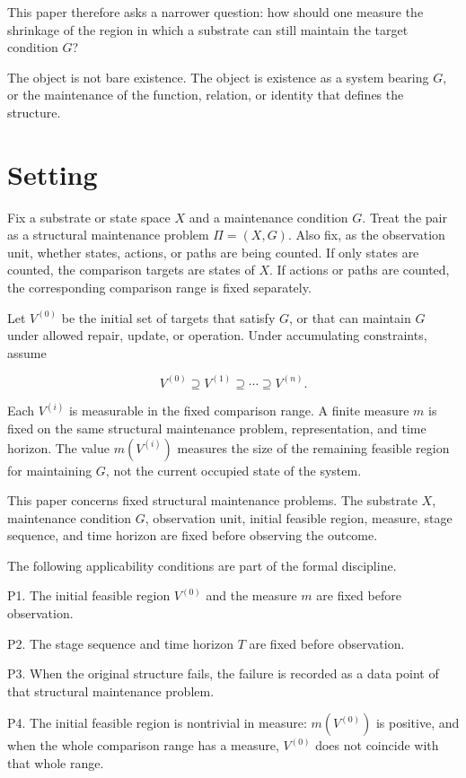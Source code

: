 \documentclass[12pt,a4paper]{article}
\begin{document}
This paper therefore asks a narrower question: how should one measure the shrinkage of the region in which a substrate can still maintain the target condition \(G\)?

The object is not bare existence. The object is existence as a system bearing \(G\), or the maintenance of the function, relation, or identity that defines the structure.

\section{Setting}\label{setting}

Fix a substrate or state space \(X\) and a maintenance condition \(G\). Treat the pair as a structural maintenance problem \(\Pi=(X,G)\). Also fix, as the observation unit, whether states, actions, or paths are being counted. If only states are counted, the comparison targets are states of \(X\). If actions or paths are counted, the corresponding comparison range is fixed separately.

Let \(V^{(0)}\) be the initial set of targets that satisfy \(G\), or that can maintain \(G\) under allowed repair, update, or operation. Under accumulating constraints, assume

\[
V^{(0)} \supseteq V^{(1)} \supseteq \cdots \supseteq V^{(n)}.
\]

Each \(V^{(i)}\) is measurable in the fixed comparison range. A finite measure \(m\) is fixed on the same structural maintenance problem, representation, and time horizon. The value \(m(V^{(i)})\) measures the size of the remaining feasible region for maintaining \(G\), not the current occupied state of the system.

This paper concerns fixed structural maintenance problems. The substrate \(X\), maintenance condition \(G\), observation unit, initial feasible region, measure, stage sequence, and time horizon are fixed before observing the outcome.

The following applicability conditions are part of the formal discipline.

P1. The initial feasible region \(V^{(0)}\) and the measure \(m\) are fixed before observation.

P2. The stage sequence and time horizon \(T\) are fixed before observation.

P3. When the original structure fails, the failure is recorded as a data point of that structural maintenance problem.

P4. The initial feasible region is nontrivial in measure: \(m(V^{(0)})\) is positive, and when the whole comparison range has a measure, \(V^{(0)}\) does not coincide with that whole range.
\end{document}
